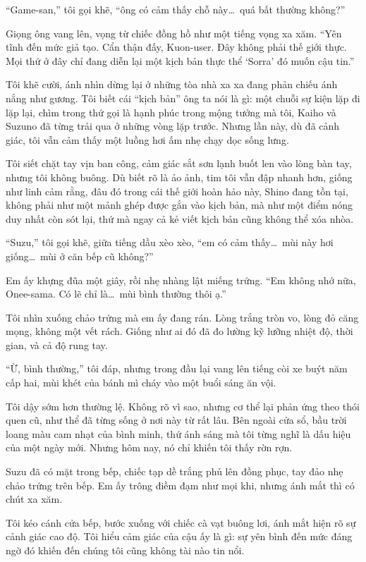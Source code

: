 \documentclass[../main.tex]{subfiles}
\begin{document}
``Game-san,'' tôi gọi khẽ, ``ông có cảm thấy chỗ này\dots\ quá bất thường không?''

Giọng ông vang lên, vọng từ chiếc đồng hồ như một tiếng vọng xa xăm. ``Yên tĩnh đến mức giả tạo. Cẩn thận đấy, Kuon-user. Đây không phải thế giới thực. Mọi thứ ở đây chỉ đang diễn lại một kịch bản thực thể `Sorra' đó muốn cậu tin.''

Tôi khẽ cười, ánh nhìn dừng lại ở những tòa nhà xa xa đang phản chiếu ánh nắng như gương. Tôi biết cái ``kịch bản'' ông ta nói là gì: một chuỗi sự kiện lặp đi lặp lại, chìm trong thứ gọi là hạnh phúc trong mộng tưởng mà tôi, Kaiho và Suzuno đã từng trải qua ở những vòng lặp trước. Nhưng lần này, dù đã cảnh giác, tôi vẫn cảm thấy một luồng hơi ấm nhẹ chạy dọc sống lưng.

Tôi siết chặt tay vịn ban công, cảm giác sắt sơn lạnh buốt len vào lòng bàn tay, nhưng tôi không buông. Dù biết rõ là ảo ảnh, tim tôi vẫn đập nhanh hơn, giống như linh cảm rằng, đâu đó trong cái thế giới hoàn hảo này, Shino đang tồn tại, không phải như một mảnh ghép được gắn vào kịch bản, mà như một điểm nóng duy nhất còn sót lại, thứ mà ngay cả kẻ viết kịch bản cũng không thể xóa nhòa.


``Suzu,'' tôi gọi khẽ, giữa tiếng dầu xèo xèo, ``em có cảm thấy\dots\ mùi này hơi giống\dots\ mùi ở căn bếp cũ không?''

Em ấy khựng đũa một giây, rồi nhẹ nhàng lật miếng trứng. ``Em không nhớ nữa, Onee-sama. Có lẽ chỉ là\dots\ mùi bình thường thôi ạ.''

Tôi nhìn xuống chảo trứng mà em ấy đang rán. Lòng trắng tròn vo, lòng đỏ căng mọng, không một vết rách. Giống như ai đó đã đo lường kỹ lưỡng nhiệt độ, thời gian, và cả độ rung tay.

``Ừ, bình thường,'' tôi đáp, nhưng trong đầu lại vang lên tiếng còi xe buýt năm cấp hai, mùi khét của bánh mì cháy vào một buổi sáng ăn vội.

Tôi dậy sớm hơn thường lệ. Không rõ vì sao, nhưng cơ thể lại phản ứng theo thói quen cũ, như thể đã từng sống ở nơi này từ rất lâu. Bên ngoài cửa sổ, bầu trời loang màu cam nhạt của bình minh, thứ ánh sáng mà tôi từng nghĩ là dấu hiệu của một ngày mới. Nhưng hôm nay, nó chỉ khiến tôi thấy rờn rợn.

Suzu đã có mặt trong bếp, chiếc tạp dề trắng phủ lên đồng phục, tay đảo nhẹ chảo trứng trên bếp. Em ấy trông điềm đạm như mọi khi, nhưng ánh mắt thì có chút xa xăm.

Tôi kéo cánh cửa bếp, bước xuống với chiếc cà vạt buông lơi, ánh mắt hiện rõ sự cảnh giác cao độ. Tôi hiểu cảm giác của cậu ấy là gì: sự yên bình đến mức đáng ngờ đó khiến đến chúng tôi cũng không tài nào tin nổi.
\end{document}
